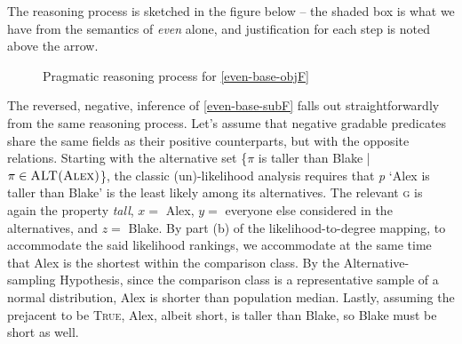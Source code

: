 \documentclass[12pt,letterpaper]{scrartcl}
\begin{document}
The reasoning process is sketched in the figure below -- the shaded box is what we have from the semantics of \textit{even} alone, and justification for each step is noted above the arrow.

\begin{figure}[h]
  \vspace{0.25cm}
  \begin{center}
     \end{center}
     \caption{Pragmatic reasoning process for \ref{even-base-objF}}
\end{figure}

The reversed, negative, inference of \ref{even-base-subF} falls out straightforwardly from the same reasoning process. Let's assume that negative gradable predicates share the same fields as their positive counterparts, but with the opposite relations. Starting with the alternative set \{$\pi$ is taller than Blake | $\pi \in \textsc{ALT(Alex)}$\}, the classic (un)-likelihood analysis requires that \textit{p} `Alex is taller than Blake' is the least likely among its alternatives. The relevant \textsc{g} is again the property \textit{tall}, $x =$ Alex, $y =$ everyone else considered in the alternatives, and $z =$ Blake. By part (b) of the likelihood-to-degree mapping, to accommodate the said likelihood rankings, we accommodate at the same time that Alex is the shortest within the comparison class. By the Alternative-sampling Hypothesis, since the comparison class is a representative sample of a normal distribution, Alex is shorter than population median. Lastly, assuming the prejacent to be \textsc{True}, Alex, albeit short, is taller than Blake, so Blake must be short as well. 
\end{document}
